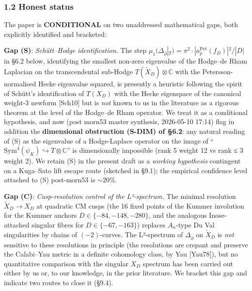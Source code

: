\documentclass[
  11pt,
  a4paper,
]{amsart}
\begin{document}
\hypertarget{honest-status}{%
\subsubsection{1.2 Honest status}\label{honest-status}}

The paper is \textbf{CONDITIONAL} on two unaddressed mathematical gaps, both
explicitly identified and bracketed:

\textbf{Gap (S)}: \emph{Schütt--Hodge identification.} The step
\(\mu_1(\Delta_{\bar\partial}|_T) = \pi^2 \cdot |a_p^{\mathrm{Pet}}(f_D)|^2 / |D|\)
in §6.2 below, identifying the smallest non-zero eigenvalue of the Hodge--de Rham
Laplacian on the transcendental sub-Hodge \(T(\widetilde{X}_D) \otimes \mathbb{C}\)
with the Petersson-normalised Hecke eigenvalue squared, is presently a heuristic
following the spirit of Schütt's identification of \(T(X_D)\) with the Hecke
eigenspace of the canonical weight-3 newform {[}Sch10{]} but is \emph{not} known to us in
the literature as a rigorous theorem at the level of the Hodge--de Rham operator.
We treat it as a conditional hypothesis, and now (post morn53 master synthesis,
2026-05-10 17:14) flag in addition the \textbf{dimensional obstruction (S-DIM) of §6.2}:
any natural reading of (S) as the eigenvalue of a Hodge-Laplace operator on the
image of ``\(\mathrm{Sym}^4(\psi_K) \hookrightarrow T \otimes \mathbb{C}\)'' is
dimensionally impossible (rank 5 weight 12 vs rank ≤ 3 weight 2). We retain (S)
in the present draft as a \emph{working hypothesis} contingent on a Kuga--Sato lift
escape route (sketched in §9.1); the empirical confidence level attached to (S)
post-morn53 is \(\sim 20\%\).

\textbf{Gap (C)}: \emph{Cusp-resolution control of the L²-spectrum.} The minimal
resolution \(\widetilde{X}_D \to X_D\) at quadratic CM cusps (the 16 fixed points
of the Kummer involution for the Kummer anchors \(D \in \{-84,-148,-280\}\), and
the analogous Inose-attached singular fibres for \(D \in \{-67,-163\}\)) replaces
\(A_n\)-type Du Val singularities by chains of \((-2)\)-curves. The L²-spectrum of
\(\Delta_{\bar\partial}\) on \(\widetilde{X}_D\) is \emph{not} sensitive to these
resolutions in principle (the resolutions are crepant and preserve the
Calabi--Yau metric in a definite cohomology class, by Yau {[}Yau78{]}), but no
quantitative comparison with the singular \(X_D\) spectrum has been carried out
either by us or, to our knowledge, in the prior literature. We bracket this
gap and indicate two routes to close it (§9.4).
\end{document}
